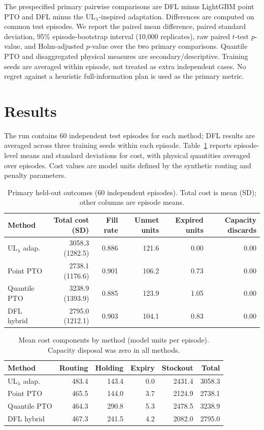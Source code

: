 \documentclass[11pt,a4paper]{article}
\begin{document}
The prespecified primary pairwise comparisons are DFL minus LightGBM point PTO and DFL minus the UL$_\lambda$-inspired adaptation. Differences are computed on common test episodes. We report the paired mean difference, paired standard deviation, 95\% episode-bootstrap interval (10,000 replicates), raw paired $t$-test $p$-value, and Holm-adjusted $p$-value over the two primary comparisons. Quantile PTO and disaggregated physical measures are secondary/descriptive. Training seeds are averaged within episode, not treated as extra independent cases. No regret against a heuristic full-information plan is used as the primary metric.

\section{Results}

The run contains 60 independent test episodes for each method; DFL results are averaged across three training seeds within each episode. Table~\ref{tab:primary-results} reports episode-level means and standard deviations for cost, with physical quantities averaged over episodes. Cost values are model units defined by the synthetic routing and penalty parameters.

\begin{table}[htbp]
\centering
\small
\caption{Primary held-out outcomes (60 independent episodes). Total cost is mean (SD); other columns are episode means.}
\label{tab:primary-results}
\begin{tabular}{lrrrrr}
\toprule
Method & Total cost (SD) & Fill rate & Unmet units & Expired units & Capacity discards \\
\midrule
UL$_\lambda$ adap. & 3058.3 (1282.5) & 0.886 & 121.6 & 0.00 & 0.00 \\
Point PTO & 2738.1 (1176.6) & 0.901 & 106.2 & 0.73 & 0.00 \\
Quantile PTO & 3238.9 (1393.9) & 0.885 & 123.9 & 1.05 & 0.00 \\
DFL hybrid & 2795.0 (1212.1) & 0.903 & 104.1 & 0.83 & 0.00 \\
\bottomrule
\end{tabular}
\end{table}

\begin{table}[htbp]
\centering
\small
\caption{Mean cost components by method (model units per episode). Capacity disposal was zero in all methods.}
\label{tab:cost-components}
\begin{tabular}{lrrrrr}
\toprule
Method & Routing & Holding & Expiry & Stockout & Total \\
\midrule
UL$_\lambda$ adap. & 483.4 & 143.4 & 0.0 & 2431.4 & 3058.3 \\
Point PTO & 465.5 & 144.0 & 3.7 & 2124.9 & 2738.1 \\
Quantile PTO & 464.3 & 290.8 & 5.3 & 2478.5 & 3238.9 \\
DFL hybrid & 467.3 & 241.5 & 4.2 & 2082.0 & 2795.0 \\
\bottomrule
\end{tabular}
\end{table}
\end{document}
